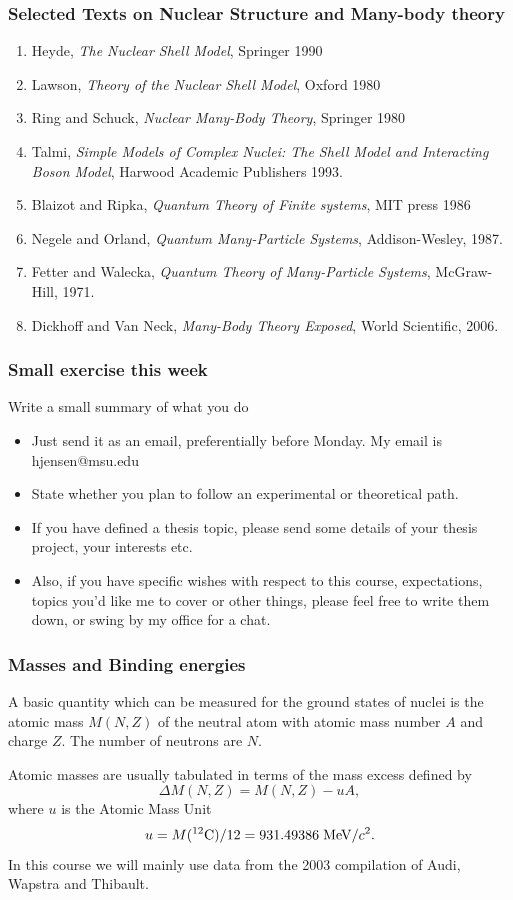 \documentclass[compress]{beamer}
\begin{document}
\frame
{
  \frametitle{Selected Texts on Nuclear Structure and Many-body theory}
 \begin{small}
 {\scriptsize

  \begin{enumerate}
   \item Heyde, {\em The Nuclear Shell Model}, Springer 1990
   \item Lawson, {\em Theory of the Nuclear Shell Model}, Oxford 1980
   \item Ring and Schuck, {\em Nuclear Many-Body Theory}, Springer 1980
   \item Talmi, {\em Simple Models of Complex Nuclei: The Shell Model and Interacting Boson Model}, Harwood Academic Publishers 1993.
   \item Blaizot and Ripka, {\em Quantum Theory of Finite systems}, MIT press 1986
   \item Negele and Orland, {\em Quantum Many-Particle Systems}, Addison-Wesley, 1987.
   \item Fetter and Walecka, {\em Quantum Theory of Many-Particle Systems}, McGraw-Hill, 1971.
   \item Dickhoff and Van Neck, {\em Many-Body Theory Exposed}, World Scientific, 2006.
\end{enumerate}
 }
 \end{small}
}


\frame
{
  \frametitle{Small exercise this week}
  \begin{block}{Write a small summary of what you do}
\begin{itemize}
\item Just send it as an email, preferentially before Monday. My email is hjensen@msu.edu
\item State whether you plan to follow an experimental or theoretical path.  
\item If you have defined a thesis topic, please send some details of your thesis project, your interests etc.
       \item Also, if you have specific wishes with respect to this course, expectations, topics you'd like me to cover or other things, please feel free to write them down, or swing by my office for a chat. 
\end{itemize}
  \end{block}
}



\frame
{
  \frametitle{Masses and Binding energies}
\begin{small}
{\scriptsize
A basic quantity which can be measured for the ground states of nuclei is the atomic mass
$M(N, Z)$ of the neutral atom with atomic mass number $A$ and charge $Z$. The number of neutrons are $N$.

Atomic masses are
usually tabulated in terms of the mass excess defined by
\[
\Delta M(N, Z) =  M(N, Z) - uA,
\]
where $u$ is the Atomic Mass Unit 
\[
u = M(^{12}\mathrm{C})/12 = 931.49386 \hspace{0.1cm} \mathrm{MeV}/c^2.
\]
In this course we will mainly use 
data from the 2003 compilation of Audi, Wapstra and Thibault.
}
\end{small}
}
\end{document}
